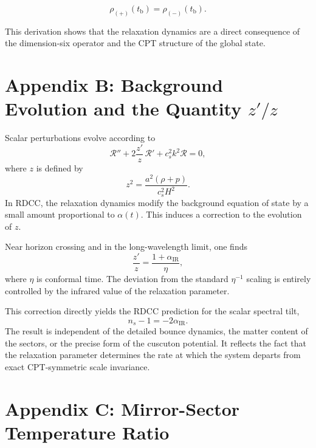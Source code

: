 \documentclass[11pt,a4paper]{article}
\begin{document}
\[
    \rho_{(+)}(t_{\mathrm{b}}) = \rho_{(-)}(t_{\mathrm{b}}).
\]



This derivation shows that the relaxation dynamics are a direct consequence of the
dimension-six operator and the CPT structure of the global state.

\section*{Appendix B: Background Evolution and the Quantity $z'/z$}

Scalar perturbations evolve according to
\begin{equation}
    \mathcal{R}'' + 2\frac{z'}{z}\,\mathcal{R}' + c_s^2 k^2 \mathcal{R} = 0,
\end{equation}
where $z$ is defined by
\begin{equation}
    z^2
    = \frac{a^2(\rho + p)}{c_s^2 H^2}.
\end{equation}
In RDCC, the relaxation dynamics modify the background equation of state by a small
amount proportional to $\alpha(t)$. This induces a correction to the evolution of $z$.

Near horizon crossing and in the long-wavelength limit, one finds
\begin{equation}
    \frac{z'}{z}
    = \frac{1 + \alpha_{\mathrm{IR}}}{\eta},
\end{equation}
where $\eta$ is conformal time. The deviation from the standard $\eta^{-1}$ scaling is
entirely controlled by the infrared value of the relaxation parameter.

This correction directly yields the RDCC prediction for the scalar spectral tilt,
\begin{equation}
    n_s - 1 = -2\alpha_{\mathrm{IR}}.
\end{equation}
The result is independent of the detailed bounce dynamics, the matter content of the
sectors, or the precise form of the cuscuton potential. It reflects the fact that the
relaxation parameter determines the rate at which the system departs from exact
CPT-symmetric scale invariance.

\section*{Appendix C: Mirror-Sector Temperature Ratio}
\end{document}
